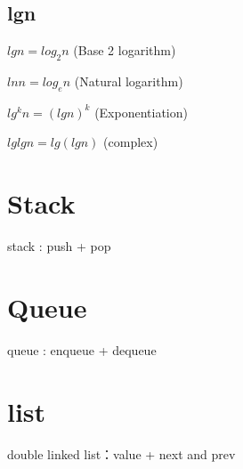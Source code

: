 \documentclass[oneside,12pt,twiside,a4paper]{ctexbook}
\begin{document}
\section{lgn}
$lgn = log_2n$ (Base 2 logarithm)

$lnn=log_en$ (Natural logarithm)

$lg^kn=(lgn)^k$ (Exponentiation)

$lglgn = lg(lgn)$ (complex)

%
\chapter{Stack}
stack : push + pop

%
\chapter{Queue}
queue : enqueue + dequeue

%
\chapter{list}
double linked list：value + next and prev
\end{document}

